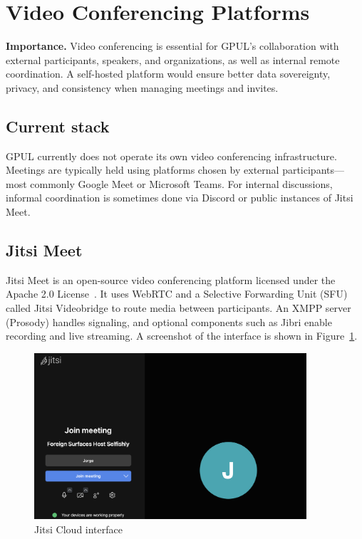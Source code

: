 \section{Video Conferencing Platforms}

\textbf{Importance.} Video conferencing is essential for GPUL's collaboration with external participants, speakers, and organizations, as well as internal remote coordination. A self-hosted platform would ensure better data sovereignty, privacy, and consistency when managing meetings and invites.

\subsection{Current stack}

GPUL currently does not operate its own video conferencing infrastructure. Meetings are typically held using platforms chosen by external participants—most commonly Google Meet or Microsoft Teams. For internal discussions, informal coordination is sometimes done via Discord or public instances of Jitsi Meet.

\subsection{Jitsi Meet}

Jitsi Meet is an open-source video conferencing platform licensed under the Apache 2.0 License~\cite{jitsi-docs}. It uses WebRTC and a Selective Forwarding Unit (SFU) called Jitsi Videobridge to route media between participants. An XMPP server (Prosody) handles signaling, and optional components such as Jibri enable recording and live streaming. A screenshot of the interface is shown in Figure~\ref{fig:jitsi-ui}.

\begin{figure}[H]
  \centering
  \includegraphics[width=0.9\textwidth]{imaxes/jitsi-ui.png}
  \caption{Jitsi Cloud interface}
  \label{fig:jitsi-ui}
\end{figure}

